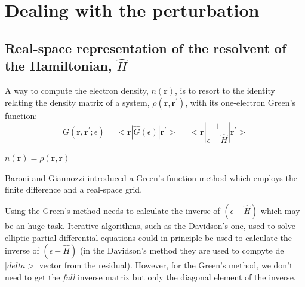 \documentclass[11pt,a4paper]{article}
\begin{document}



\section{Dealing with the perturbation}

\subsection{Real-space representation of the resolvent of the Hamiltonian, $\hat{H}$}

 
A way to compute the electron density, $n(\bm{r})$, is to resort to the identity relating the density matrix of a system, $\rho(\bm{r},\bm{r}^\prime)$, with its one-electron Green's function:
\begin{equation}
  G(\bm{r},\bm{r}^\prime;\epsilon)=<\bm{r}|\hat{G}(\epsilon)|\bm{r}^\prime>=<\bm{r}|\frac{1}{\epsilon-\hat{H}}|\bm{r}^\prime>
\end{equation}

$n(\bm{r})=\rho(\bm{r},\bm{r})$

Baroni and Giannozzi\cite{baroni1991} introduced a Green's function method which employs the finite difference and a real-space grid.

Using the Green's method needs to calculate the inverse of $(\epsilon-\hat{H})$ which may be an huge task.
Iterative algorithms, such as the Davidson's one, used to solve elliptic partial differential equations could in principle be used to calculate the inverse of   $(\epsilon-\hat{H})$  (in the Davidson's method they are used to compyte de $|delta>$ vector from the residual).
However, for the Green's method, we don't need to get the \emph{full} inverse matrix but only the diagonal element of the inverse.
\end{document}
